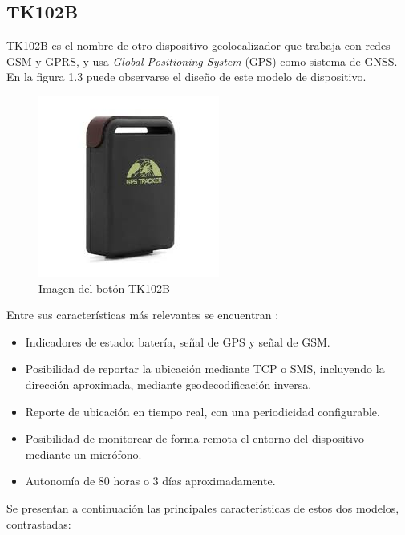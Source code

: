 \subsection{TK102B}

TK102B es el nombre de otro dispositivo geolocalizador que trabaja con redes GSM y GPRS, y usa \textit{Global Positioning System} (GPS) como sistema de GNSS. En la figura 1.3 puede observarse el diseño de este modelo de dispositivo.

\begin{figure}[H]
	\centering
	\includegraphics[width=.6\textwidth]{./Figures/tk102b.jpg}
	\caption{Imagen del botón TK102B}
	\label{fig:texmaker}
\end{figure}

Entre sus características más relevantes se encuentran \citep{TK102BMANUAL:1}:
\begin{itemize}
\item Indicadores de estado: batería, señal de GPS y señal de GSM.
\item Posibilidad de reportar la ubicación mediante TCP o SMS, incluyendo la dirección aproximada, mediante geodecodificación inversa.
\item Reporte de ubicación en tiempo real, con una periodicidad configurable.
\item Posibilidad de monitorear de forma remota el entorno del dispositivo mediante un micrófono.
\item Autonomía de 80 horas o 3 días aproximadamente.
\end{itemize}


Se presentan a continuación las principales características de estos dos modelos, contrastadas:

